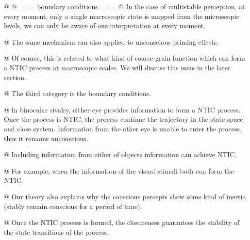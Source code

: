 \documentclass[utf8]{article}
\begin{document}
        
        

		
		\begin{ants}
        	@ 
        	@  === boundary conditions  === 
        	    @ In the case of multistable perception, at every moment, only a single macroscopic state is mapped from the microscopic levels, we can only be aware of one interpretation at every moment. 
        	    
        	    
        	    @ The same mechanism can also applied to unconscious priming effects. 
        	    
        	    @ Of course, this is related to what kind of coarse-grain function which can form a NTIC process at macroscopic scales. We will discuss this issue in the later section.
        	    
        	   
        	   
        	   
        	   @ The third category is the boundary conditions. 
        	   
        	   @ In binocular rivalry, either eye provides information to form a NTIC process. Once the process is NTIC, the process continue the trajectory in the state space and close system. Information from the other eye is unable to enter the process, thus it remains unconscious. 
        	   
        	   @ Including information from either of objects information can achieve NTIC. 
        	   
        	   @ For example, when the information of the visual stimuli both can form the NTIC.
        	   
        	   @ Our theory also explains why the conscious percepts show some kind of inertia (stably remain conscious for a period of time). 
        	   
        	   @ Once the NTIC process is formed, the closureness guarantees the stability of the state transitions of the process. 
                
            \end{ants}
        
        


		
\end{document}
